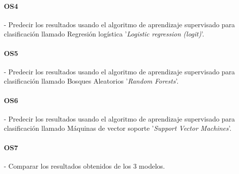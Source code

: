 \label{os:OS4}
\paragraph{OS4} - Predecir los resultados usando el algoritmo de aprendizaje supervisado para clasificación llamado Regresión logística '\textit{Logistic regression (logit)}'.

\label{os:OS5}
\paragraph{OS5} - Predecir los resultados usando el algoritmo de aprendizaje supervisado para clasificación llamado Bosques Aleatorios '\textit{Random Forests}'.

\label{os:OS6}
\paragraph{OS6} - Predecir los resultados usando el algoritmo de aprendizaje supervisado para clasificación llamado Máquinas de vector soporte '\textit{Support Vector Machines}'.

\label{os:OS7}
\paragraph{OS7} - Comparar los resultados obtenidos de los 3 modelos.